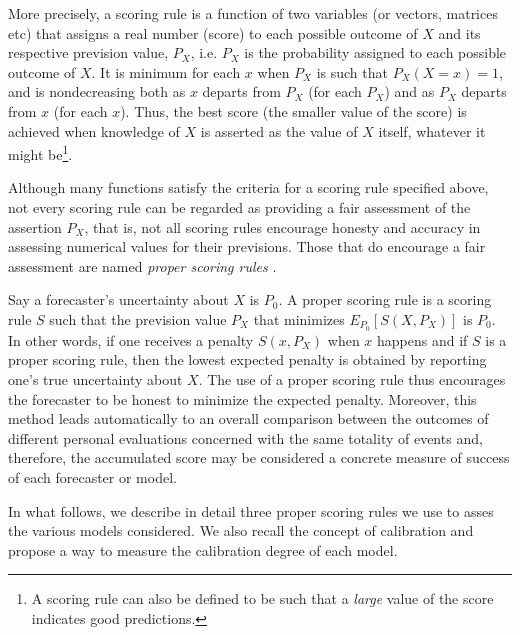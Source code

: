 \documentclass[journal,article,accept,moreauthors,pdftex,12pt,a4paper]{mdpi}
\begin{document}
More precisely, a scoring rule is a function of two variables (or vectors, matrices etc) that assigns a real number (score) to each possible outcome of $X$ and its respective prevision value, $P_X$, i.e. $P_X$ is the probability assigned to each possible outcome of $X$.
It is minimum for each $x$ when $P_X$ is such that $P_X(X=x)=1$, and is nondecreasing both as $x$ departs from $P_X$ (for each $P_X$) and as $P_X$ departs from $x$ (for each $x$).
Thus, the best score (the smaller value of the score) is achieved when knowledge of $X$ is asserted as the value of $X$ itself, whatever it might be\footnote{A scoring rule can also be defined to be such that a \emph{large} value of the score indicates good predictions.}.

Although many functions satisfy the criteria for a scoring rule specified above, not every scoring rule can be regarded as providing a fair assessment of the assertion $P_X$, that is, not all scoring rules encourage honesty and accuracy in assessing numerical values for their previsions.
Those that do encourage a fair assessment are named \emph{proper scoring rules} \cite{lad}.

Say a forecaster's uncertainty about $X$ is $P_0$. A proper scoring rule is a scoring rule $S$ such that the prevision value $P_X$ that minimizes $E_{P_0}[S(X,P_X)]$ is $P_0$.
In other words, if one receives a penalty $S(x,P_X)$ when $x$ happens and if $S$ is a proper scoring rule, then the lowest expected penalty is obtained by reporting one's  true uncertainty about $X$.
The use of a proper scoring rule thus encourages the forecaster to be honest to minimize the expected penalty.
Moreover, this method leads automatically to an overall comparison between the outcomes of different personal evaluations concerned with the same totality of events and, therefore, the accumulated score may be considered a concrete measure of success of each forecaster or model.

In what follows, we describe in detail three proper scoring rules we use to asses the various models considered.
We also recall the concept of calibration and propose a way to measure the calibration degree of each model.

\end{document}
